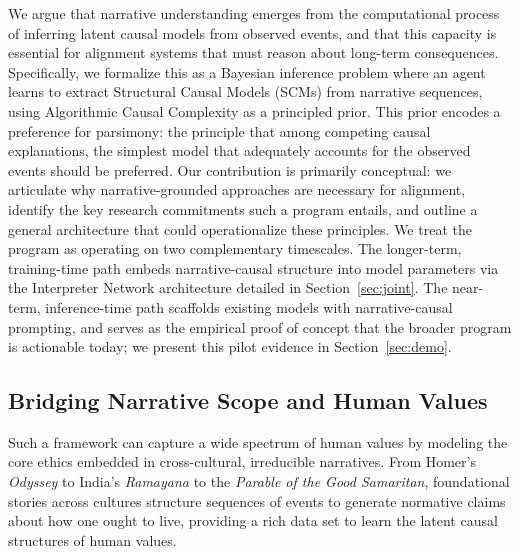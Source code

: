 \documentclass{article}
\theoremstyle{plain}
\theoremstyle{definition}
\theoremstyle{remark}
\begin{document}
We argue that narrative understanding emerges from the computational process of inferring latent causal models from observed events, and that this capacity is essential for alignment systems that must reason about long-term consequences. Specifically, we formalize this as a Bayesian inference problem where an agent learns to extract Structural Causal Models (SCMs) from narrative sequences, using Algorithmic Causal Complexity as a principled prior. This prior encodes a preference for parsimony: the principle that among competing causal explanations, the simplest model that adequately accounts for the observed events should be preferred. Our contribution is primarily conceptual: we articulate why narrative-grounded approaches are necessary for alignment, identify the key research commitments such a program entails, and outline a general architecture that could operationalize these principles. We treat the program as operating on two complementary timescales. The longer-term, training-time path embeds narrative-causal structure into model parameters via the Interpreter Network architecture detailed in Section~\ref{sec:joint}. The near-term, inference-time path scaffolds existing models with narrative-causal prompting, and serves as the empirical proof of concept that the broader program is actionable today; we present this pilot evidence in Section~\ref{sec:demo}.

\subsection{Bridging Narrative Scope and Human Values}

Such a framework can capture a wide spectrum of human values by modeling the core ethics embedded in cross-cultural, irreducible narratives. From Homer's \textit{Odyssey} to India's \textit{Ramayana} to the \textit{Parable of the Good Samaritan}, foundational stories across cultures structure sequences of events to generate normative claims about how one ought to live, providing a rich data set to learn the latent causal structures of human values.
\end{document}
